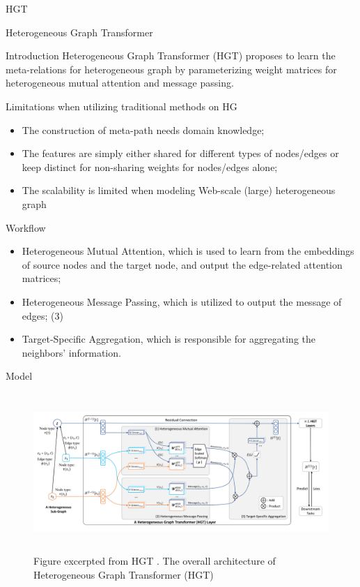 \documentclass[aspectratio=1610,xcolor={dvipsnames},hyperref={colorlinks,unicode,linkcolor=violet,anchorcolor=blueviolet,citecolor=YellowOrange,filecolor=black,urlcolor=Aquamarine}]{beamer}
\begin{document}
\begin{frame}[label={sec:org8ee1bb4}]{HGT}
\begin{center}
\Huge Heterogeneous Graph Transformer
\end{center}

\autocite{huHeterogeneousGraphTransformer2020}
\end{frame}

\begin{frame}[label={sec:orgf8c4d17}]{Introduction}
Heterogeneous Graph Transformer (HGT) proposes to learn the
meta-relations for heterogeneous graph by parameterizing weight
matrices for heterogeneous mutual attention and message passing.
\end{frame}

\begin{frame}[label={sec:org3ac359d}]{Limitations when utilizing traditional methods on HG}
\begin{itemize}
\item The construction of meta-path needs domain knowledge;
\item The features are simply either shared for different types of
nodes/edges or keep distinct for non-sharing weights for nodes/edges alone;
\item The scalability is limited when modeling Web-scale (large)
heterogeneous graph
\end{itemize}
\end{frame}

\begin{frame}[label={sec:org8a1a754}]{Workflow}
\begin{itemize}
\item Heterogeneous Mutual Attention, which is used to learn from the
embeddings of source nodes and the target node, and output the
edge-related attention matrices;
\item Heterogeneous Message Passing, which is utilized to output the
message of edges; (3)
\item Target-Specific Aggregation, which is responsible for aggregating the neighbors’ information.
\end{itemize}
\end{frame}

\begin{frame}[label={sec:orgfdba38f}]{Model}
\begin{figure}[htbp]
\centering
\includegraphics[height=6cm]{./p6.png}
\caption{\small Figure excerpted from HGT \autocite{huHeterogeneousGraphTransformer2020}. The overall architecture of Heterogeneous Graph Transformer (HGT)}
\end{figure}
\end{frame}
\end{document}
